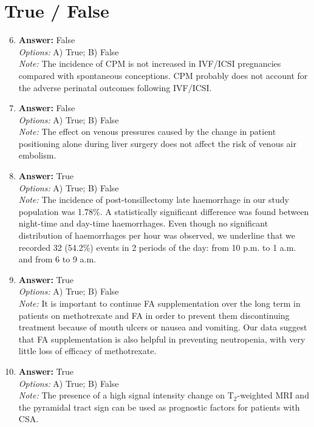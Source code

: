 \documentclass[12pt]{article}
\begin{document}
\section*{True / False}
\begin{enumerate}[label=\arabic*.]
\setcounter{enumi}{5}
\item \textbf{Answer:} False
\\ \textit{Options:} A) True; B) False
\\ \textit{Note:} The incidence of CPM is not increased in IVF/ICSI pregnancies compared with spontaneous conceptions. CPM probably does not account for the adverse perinatal outcomes following IVF/ICSI.
\item \textbf{Answer:} False
\\ \textit{Options:} A) True; B) False
\\ \textit{Note:} The effect on venous pressures caused by the change in patient positioning alone during liver surgery does not affect the risk of venous air embolism.
\item \textbf{Answer:} True
\\ \textit{Options:} A) True; B) False
\\ \textit{Note:} The incidence of post-tonsillectomy late haemorrhage in our study population was 1.78\%. A statistically significant difference was found between night-time and day-time haemorrhages. Even though no significant distribution of haemorrhages per hour was observed, we underline that we recorded 32 (54.2\%) events in 2 periods of the day: from 10 p.m. to 1 a.m. and from 6 to 9 a.m.
\item \textbf{Answer:} True
\\ \textit{Options:} A) True; B) False
\\ \textit{Note:} It is important to continue FA supplementation over the long term in patients on methotrexate and FA in order to prevent them discontinuing treatment because of mouth ulcers or nausea and vomiting. Our data suggest that FA supplementation is also helpful in preventing neutropenia, with very little loss of efficacy of methotrexate.
\item \textbf{Answer:} True
\\ \textit{Options:} A) True; B) False
\\ \textit{Note:} The presence of a high signal intensity change on T$_{2}$-weighted MRI and the pyramidal tract sign can be used as prognostic factors for patients with CSA.
\end{enumerate}
\end{document}
